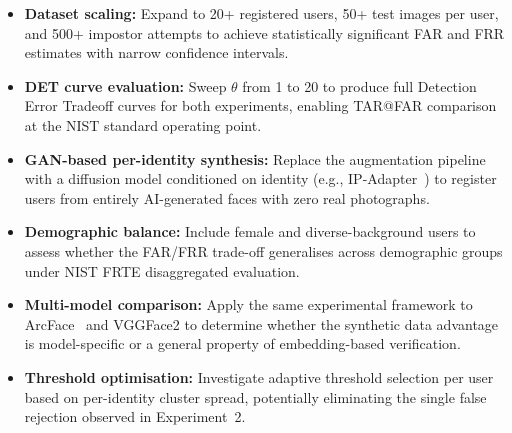 \documentclass[conference]{IEEEtran}
\begin{document}
\begin{itemize}
    \item \textbf{Dataset scaling:} Expand to 20+ registered users, 50+ test images per user, and 500+ impostor attempts to achieve statistically significant FAR and FRR estimates with narrow confidence intervals.
    \item \textbf{DET curve evaluation:} Sweep $\theta$ from 1 to 20 to produce full Detection Error Tradeoff curves for both experiments, enabling TAR@FAR comparison at the NIST standard operating point.
    \item \textbf{GAN-based per-identity synthesis:} Replace the augmentation pipeline with a diffusion model conditioned on identity (e.g., IP-Adapter~\cite{ye2023ip}) to register users from entirely AI-generated faces with zero real photographs.
    \item \textbf{Demographic balance:} Include female and diverse-background users to assess whether the FAR/FRR trade-off generalises across demographic groups under NIST FRTE disaggregated evaluation.
    \item \textbf{Multi-model comparison:} Apply the same experimental framework to ArcFace~\cite{deng2019insightface} and VGGFace2 to determine whether the synthetic data advantage is model-specific or a general property of embedding-based verification.
    \item \textbf{Threshold optimisation:} Investigate adaptive threshold selection per user based on per-identity cluster spread, potentially eliminating the single false rejection observed in Experiment~2.
\end{itemize}
\end{document}
